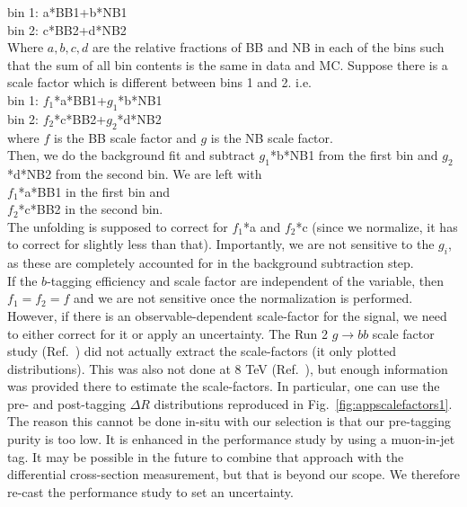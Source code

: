 \documentclass[UKenglish,texlive=2013]{\ATLASLATEXPATH atlasdoc}
\begin{document}
bin 1: a*BB1+b*NB1\\
bin 2: c*BB2+d*NB2\\

Where $a,b,c,d$ are the relative fractions of BB and NB in each of the bins such that the sum of all bin contents is the same in data and MC. Suppose there is a scale factor which is different between bins 1 and 2.  i.e. \\

bin 1: $f_1$*a*BB1+$g_1$*b*NB1\\
bin 2: $f_2$*c*BB2+$g_2$*d*NB2\\

where $f$ is the BB scale factor and $g$ is the NB scale factor.\\

Then, we do the background fit and subtract $g_1$*b*NB1 from the first bin and $g_2$*d*NB2 from the second bin.  We are left with\\

$f_1$*a*BB1 in the first bin and\\
$f_2$*c*BB2 in the second bin.\\

The unfolding is supposed to correct for $f_1$*a and $f_2$*c (since we normalize, it has to correct for slightly less than that).  Importantly, we are not sensitive to the $g_i$, as these are completely accounted for in the background subtraction step.\\

If the $b$-tagging efficiency and scale factor are independent of the variable, then $f_1=f_2=f$ and we are not sensitive once the normalization is performed.  However, if there is an observable-dependent scale-factor for the signal, we need to either correct for it or apply an uncertainty.  The Run 2 $g\rightarrow bb$ scale factor study (Ref.~\cite{ATLAS-CONF-2016-039}) did not actually extract the scale-factors (it only plotted distributions).  This was also not done at 8 TeV (Ref.~\cite{ATLAS-CONF-2016-002}), but enough information was provided there to estimate the scale-factors.  In particular, one can use the pre- and post-tagging $\Delta R$ distributions reproduced in Fig.~\ref{fig:appscalefactors1}.  The reason this cannot be done in-situ with our selection is that our pre-tagging purity is too low.  It is enhanced in the performance study by using a muon-in-jet tag.  It may be possible in the future to combine that approach with the differential cross-section measurement, but that is beyond our scope.  We therefore re-cast the performance study to set an uncertainty.
\end{document}
